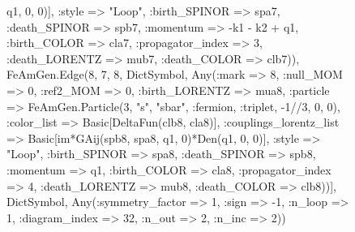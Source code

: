 \documentclass{revtex4}
\begin{document}
\begin{figure}[!htb]
\begin{center}
{q1, 0, 0)], :style => "Loop", :birth_SPINOR => spa7, :death_SPINOR => spb7, :momentum => -k1 - k2 + q1, :birth_COLOR => cla7, :propagator_index => 3, :death_LORENTZ => mub7, :death_COLOR => clb7)), FeAmGen.Edge(8, 7, 8, Dict{Symbol, Any}(:mark => 8, :null_MOM => 0, :ref2_MOM => 0, :birth_LORENTZ => mua8, :particle => FeAmGen.Particle(3, "s", "sbar", :fermion, :triplet, -1//3, 0, 0), :color_list => Basic[DeltaFun(clb8, cla8)], :couplings_lorentz_list => Basic[im*GAij(spb8, spa8, q1, 0)*Den(q1, 0, 0)], :style => "Loop", :birth_SPINOR => spa8, :death_SPINOR => spb8, :momentum => q1, :birth_COLOR => cla8, :propagator_index => 4, :death_LORENTZ => mub8, :death_COLOR => clb8))], Dict{Symbol, Any}(:symmetry_factor => 1, :sign => -1, :n_loop => 1, :diagram_index => 32, :n_out => 2, :n_inc => 2)) 
}
\end{center}
\end{figure}
\end{document}
